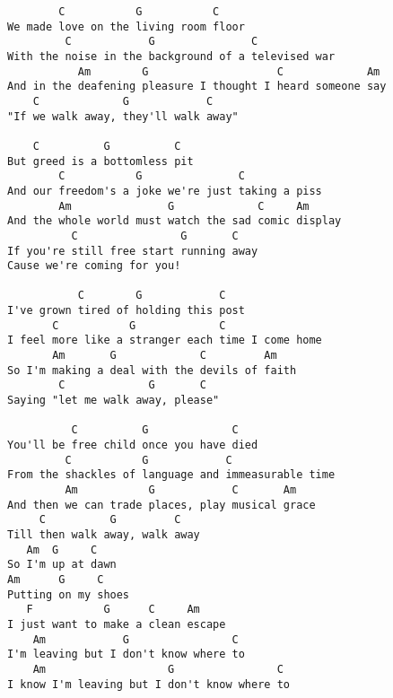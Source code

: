 \documentclass[leqno]{memoir}
\begin{document}
\begin{verbatim}
        C           G           C
We made love on the living room floor
         C            G               C
With the noise in the background of a televised war
           Am        G                    C             Am
And in the deafening pleasure I thought I heard someone say
    C             G            C
"If we walk away, they'll walk away"

    C          G          C
But greed is a bottomless pit
        C           G               C
And our freedom's a joke we're just taking a piss
        Am               G             C     Am
And the whole world must watch the sad comic display
          C                G       C
If you're still free start running away
Cause we're coming for you!

           C        G            C
I've grown tired of holding this post
       C           G             C
I feel more like a stranger each time I come home
       Am       G             C         Am
So I'm making a deal with the devils of faith
        C             G       C
Saying "let me walk away, please"

          C          G             C
You'll be free child once you have died
         C           G            C
From the shackles of language and immeasurable time
         Am           G            C       Am
And then we can trade places, play musical grace
     C          G         C
Till then walk away, walk away
   Am  G     C
So I'm up at dawn
Am      G     C
Putting on my shoes
   F           G      C     Am
I just want to make a clean escape
    Am            G                C
I'm leaving but I don't know where to
    Am                   G                C
I know I'm leaving but I don't know where to
\end{verbatim}
\newpage
\end{document}
